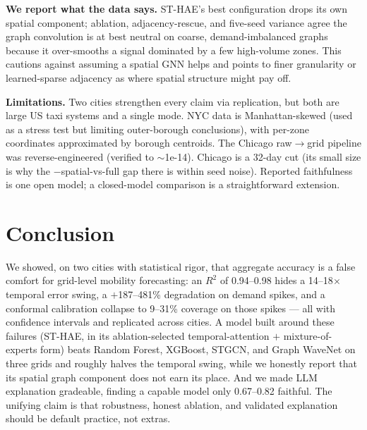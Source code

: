 \documentclass[sigconf, review, nonacm]{acmart}
\begin{document}
\textbf{We report what the data says.} ST-HAE's best configuration drops its own spatial component;
ablation, adjacency-rescue, and five-seed variance agree the graph convolution is at best neutral on
coarse, demand-imbalanced graphs because it over-smooths a signal dominated by a few high-volume zones.
This cautions against assuming a spatial GNN helps and points to finer granularity or learned-sparse
adjacency as where spatial structure might pay off.

\textbf{Limitations.} Two cities strengthen every claim via replication, but both are large US taxi
systems and a single mode. NYC data is Manhattan-skewed (used as a stress test but limiting
outer-borough conclusions), with per-zone coordinates approximated by borough centroids. The Chicago
raw$\rightarrow$grid pipeline was reverse-engineered (verified to $\sim$1e{-}14). Chicago is a 32-day
cut (its small size is why the $-$spatial-vs-full gap there is within seed noise). Reported faithfulness
is one open model; a closed-model comparison is a straightforward extension.

\section{Conclusion}
We showed, on two cities with statistical rigor, that aggregate accuracy is a false comfort for
grid-level mobility forecasting: an $R^2$ of 0.94--0.98 hides a 14--18$\times$ temporal error swing, a
$+$187--481\% degradation on demand spikes, and a conformal calibration collapse to 9--31\% coverage on
those spikes --- all with confidence intervals and replicated across cities. A model built around these
failures (ST-HAE, in its ablation-selected temporal-attention $+$ mixture-of-experts form) beats
Random Forest, XGBoost, STGCN, and Graph WaveNet on three grids and roughly halves the temporal swing,
while we honestly report that its spatial graph component does not earn its place. And we made LLM
explanation gradeable, finding a capable model only 0.67--0.82 faithful. The unifying claim is that
robustness, honest ablation, and validated explanation should be default practice, not extras.



\end{document}
